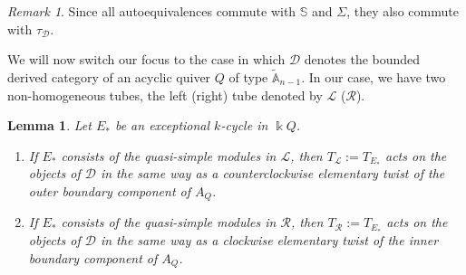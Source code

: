 \documentclass[12pt]{amsart}
\theoremstyle{plain}
\newtheorem{lem}[thm]{Lemma}
\theoremstyle{definition}
\theoremstyle{remark}
\newtheorem{rem}{Remark}[section]
\begin{document}
\begin{rem}\label{rem: twist functor commutes with}
Since all autoequivalences commute with $\mathbb{S}$ and $\Sigma$, they also commute with $\tau_{\mathscr{D}}$.
\end{rem}

We will now switch our focus to the case in which $\mathscr{D}$ denotes the bounded derived category of an acyclic quiver $Q$ of type $\tilde{\mathbb{A}}_{n-1}$. In our case, we have two non-homogeneous tubes, the left (right) tube denoted by $\mathscr{L}$ ($\mathscr{R}$).

\begin{lem}\label{lem: twists are twists}
Let $E_{*}$ be an exceptional $k$-cycle in $\Bbbk Q$. 

\begin{enumerate}
\item If $E_*$ consists of the quasi-simple modules in $\mathscr{L}$, then $T_{\mathscr{L}} := T_{E_*}$ acts on the objects of $\mathscr{D}$ in the same way as a counterclockwise elementary twist of the outer boundary component of $A_Q$.
\item If $E_*$ consists of the quasi-simple modules in $\mathscr{R}$, then $T_{\mathscr{R}} := T_{E_*}$ acts on the objects of $\mathscr{D}$ in the same way as a clockwise elementary twist of the inner boundary component of $A_Q$.
\end{enumerate}
\end{lem} 
\end{document}
